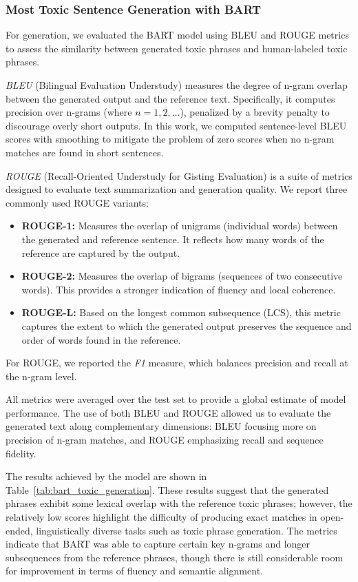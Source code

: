 \documentclass[conference]{IEEEtran}
\begin{document}
\subsubsection{Most Toxic Sentence Generation with BART}
\noindent

For generation, we evaluated the BART model using BLEU and ROUGE metrics to assess the similarity between generated toxic phrases and human-labeled toxic phrases. 

\emph{BLEU} (Bilingual Evaluation Understudy) \cite{BLEU2002} measures the degree of n-gram overlap between the generated output and the reference text. Specifically, it computes precision over n-grams (where $n=1,2,\dots$), penalized by a brevity penalty to discourage overly short outputs. In this work, we computed sentence-level BLEU scores with smoothing to mitigate the problem of zero scores when no n-gram matches are found in short sentences.

\emph{ROUGE} (Recall-Oriented Understudy for Gisting Evaluation) \cite{ROUGE2004} is a suite of metrics designed to evaluate text summarization and generation quality. We report three commonly used ROUGE variants:
\begin{itemize}
    \item \textbf{ROUGE-1:} Measures the overlap of unigrams (individual words) between the generated and reference sentence. It reflects how many words of the reference are captured by the output.
    \item \textbf{ROUGE-2:} Measures the overlap of bigrams (sequences of two consecutive words). This provides a stronger indication of fluency and local coherence.
    \item \textbf{ROUGE-L:} Based on the longest common subsequence (LCS), this metric captures the extent to which the generated output preserves the sequence and order of words found in the reference.
\end{itemize}
For ROUGE, we reported the \emph{F1} measure, which balances precision and recall at the n-gram level.

All metrics were averaged over the test set to provide a global estimate of model performance. The use of both BLEU and ROUGE allowed us to evaluate the generated text along complementary dimensions: BLEU focusing more on precision of n-gram matches, and ROUGE emphasizing recall and sequence fidelity.

The results achieved by the model are shown in Table~\ref{tab:bart_toxic_generation}. These results suggest that the generated phrases exhibit some lexical overlap with the reference toxic phrases; however, the relatively low scores highlight the difficulty of producing exact matches in open-ended, linguistically diverse tasks such as toxic phrase generation. The metrics indicate that BART was able to capture certain key n-grams and longer subsequences from the reference phrases, though there is still considerable room for improvement in terms of fluency and semantic alignment.
\end{document}
